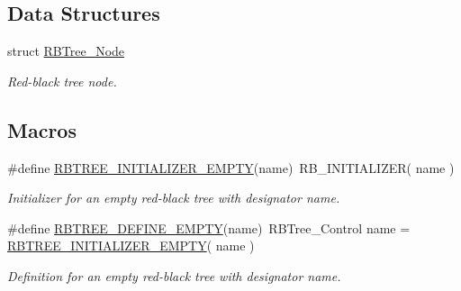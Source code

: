 \subsection*{Data Structures}
\begin{DoxyCompactItemize}
\item 
struct \mbox{\hyperlink{structRBTree__Node}{R\+B\+Tree\+\_\+\+Node}}
\begin{DoxyCompactList}\small\item\em Red-\/black tree node. \end{DoxyCompactList}\end{DoxyCompactItemize}
\subsection*{Macros}
\begin{DoxyCompactItemize}
\item 
\mbox{\label{group__RTEMSScoreRBTree_gae75b07f4e75d776a7a1eedde8b22ca85}} 
\#define \mbox{\hyperlink{group__RTEMSScoreRBTree_gae75b07f4e75d776a7a1eedde8b22ca85}{R\+B\+T\+R\+E\+E\+\_\+\+I\+N\+I\+T\+I\+A\+L\+I\+Z\+E\+R\+\_\+\+E\+M\+P\+TY}}(name)~R\+B\+\_\+\+I\+N\+I\+T\+I\+A\+L\+I\+Z\+ER( name )
\begin{DoxyCompactList}\small\item\em Initializer for an empty red-\/black tree with designator {\itshape name}. \end{DoxyCompactList}\item 
\mbox{\label{group__RTEMSScoreRBTree_ga87fa6213376a9feed10d3de0a39e61be}} 
\#define \mbox{\hyperlink{group__RTEMSScoreRBTree_ga87fa6213376a9feed10d3de0a39e61be}{R\+B\+T\+R\+E\+E\+\_\+\+D\+E\+F\+I\+N\+E\+\_\+\+E\+M\+P\+TY}}(name)~R\+B\+Tree\+\_\+\+Control name = \mbox{\hyperlink{group__RTEMSScoreRBTree_gae75b07f4e75d776a7a1eedde8b22ca85}{R\+B\+T\+R\+E\+E\+\_\+\+I\+N\+I\+T\+I\+A\+L\+I\+Z\+E\+R\+\_\+\+E\+M\+P\+TY}}( name )
\begin{DoxyCompactList}\small\item\em Definition for an empty red-\/black tree with designator {\itshape name}. \end{DoxyCompactList}\end{DoxyCompactItemize}
